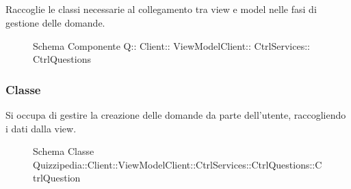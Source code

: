 \subsection{}
Raccoglie le classi necessarie al collegamento tra view e model nelle fasi di gestione delle domande.
\begin{figure}[H]
\centering
\noindent{}
\caption[Schema Componente Quizzipedia::Client::ViewModelClient::CtrlServices::CtrlQuestions]{Schema Componente Q:: Client:: ViewModelClient:: CtrlServices:: CtrlQuestions}
\end{figure}
\subsubsection{Classe }
Si occupa di gestire la creazione delle domande da parte dell'utente, raccogliendo i dati dalla view.
\begin{figure}[H]
\centering
\noindent{}
\caption[Schema Classe CtrlQuestion]{Schema Classe Quizzipedia::Client::ViewModelClient::CtrlServices::CtrlQuestions::CtrlQuestion}
\end{figure}
